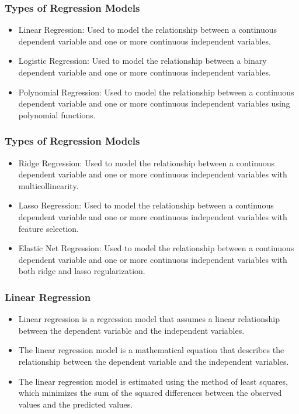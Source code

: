 \documentclass[serif, 9pt, aspectratio=32]{beamer}
\begin{document}
\begin{frame}
    \frametitle{Types of Regression Models}
    \begin{itemize}
        \setlength{\itemsep}{2em}
        \item Linear Regression: Used to model the relationship between a continuous dependent variable and one or more continuous independent variables.
        \item Logistic Regression: Used to model the relationship between a binary dependent variable and one or more continuous independent variables.
        \item Polynomial Regression: Used to model the relationship between a continuous dependent variable and one or more continuous independent variables using polynomial functions.
    \end{itemize}
\end{frame}

\begin{frame}
    \frametitle{Types of Regression Models}
    \begin{itemize}
        \setlength{\itemsep}{2em}
        \item Ridge Regression: Used to model the relationship between a continuous dependent variable and one or more continuous independent variables with multicollinearity.
        \item Lasso Regression: Used to model the relationship between a continuous dependent variable and one or more continuous independent variables with feature selection.
        \item Elastic Net Regression: Used to model the relationship between a continuous dependent variable and one or more continuous independent variables with both ridge and lasso regularization.
    \end{itemize}
\end{frame}

\begin{frame}
    \frametitle{Linear Regression}
    \begin{itemize}
        \setlength{\itemsep}{2em}
        \item Linear regression is a regression model that assumes a linear relationship between the dependent variable and the independent variables.
        \item The linear regression model is a mathematical equation that describes the relationship between the dependent variable and the independent variables.
        \item The linear regression model is estimated using the method of least squares, which minimizes the sum of the squared differences between the observed values and the predicted values.
    \end{itemize}
\end{frame}
\end{document}
